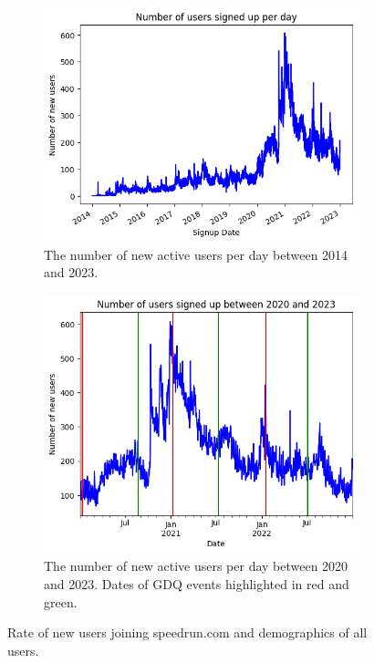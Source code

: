 \begin{figure}[h]
    \centering
    \begin{subfigure}{0.45\linewidth}
        \centering
        \includegraphics[width=\linewidth]{images/users_per_day.png}
        \caption{The number of new active users per day between 2014 and 2023.}
        \label{fig:figure1}
    \end{subfigure}
    \label{fig:figures}
    \hspace{0.05\linewidth}
    \begin{subfigure}{0.45\linewidth}
        \centering
        \includegraphics[width=\linewidth]{images/user_per_day_2020_2023.png}
        \caption{The number of new active users per day between 2020 and 2023. Dates of GDQ events highlighted in red and green.}
        \label{fig:figure2}
    \end{subfigure}
    \caption{Rate of new users joining speedrun.com and demographics of all users.}
    \label{fig:figures}
\end{figure}

